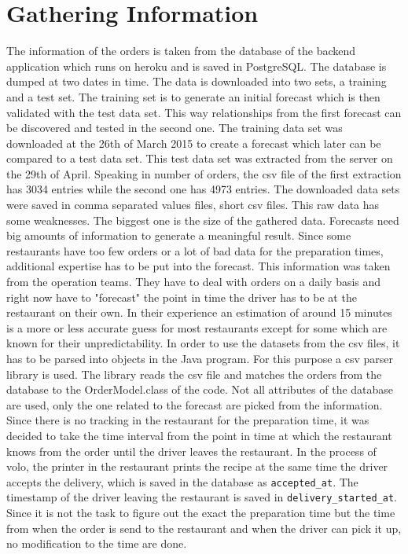 \section{Gathering Information}\label{section:Gathering Information}
The information of the orders is taken from the database of the backend application which runs on heroku and is saved in PostgreSQL. The database is dumped at two dates in time. The data is downloaded into two sets, a training and a test set. The training set is to generate an initial forecast which is then validated with the test data set. This way relationships from the first forecast can be discovered and tested in the second one. The training data set was downloaded at the 26th of March 2015 to create a forecast which later can be compared to a test data set. This test data set was extracted from the server on the 29th of April. Speaking in number of orders, the csv file of the first extraction has 3034 entries while the second one has 4973 entries. The downloaded data sets were saved in comma separated values files, short csv files.\newline
This raw data has some weaknesses. The biggest one is the size of the gathered data. Forecasts need big amounts of information to generate a meaningful result. Since some restaurants have too few orders or a lot of bad data for the preparation times, additional expertise has to be put into the forecast. This information was taken from the operation teams. They have to deal with orders on a daily basis and right now have to "forecast" the point in time the driver has to be at the restaurant on their own. In their experience an estimation of around 15 minutes is a more or less accurate guess for most restaurants except for some which are known for their unpredictability.\newline
In order to use the datasets from the csv files, it has to be parsed into objects in the Java program. For this purpose a csv parser library is used. The library reads the csv file and matches the orders from the database to the OrderModel.class of the code. Not all attributes of the database are used, only the one related to the forecast are picked from the information. Since there is no tracking in the restaurant for the preparation time, it was decided to take the time interval from the point in time at which the restaurant knows from the order until the driver leaves the restaurant. In the process of volo, the printer in the restaurant prints the recipe at the same time the driver accepts the delivery, which is saved in the database as \texttt{accepted\_at}. The timestamp of the driver leaving the restaurant is saved in \texttt{delivery\_started\_at}. Since it is not the task to figure out the exact the preparation time but the time from when the order is send to the restaurant and when the driver can pick it up, no modification to the time are done.
